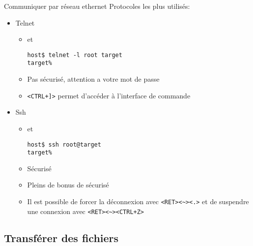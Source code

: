\begin{frame}[fragile=singleslide]{Communiquer par réseau ethernet}
  Protocoles les plus utilisés:
  \begin{itemize}
  \item Telnet
    \begin{itemize}
    \item {} et 
\begin{lstlisting}
host$ telnet -l root target
target%
\end{lstlisting} %
    \item   Pas   sécurisé,   attention   a   votre   mot   de   passe
    \item \verb/<CTRL+]>/ permet d'accéder à l'interface de commande
    \end{itemize}
  \item Ssh
    \begin{itemize}
    \item {} et 
\begin{lstlisting}
host$ ssh root@target
target%
\end{lstlisting} %
    \item Sécurisé
    \item Pleins de bonus de sécurisé
    \item   Il   est   possible   de  forcer   la   déconnexion   avec
      \verb/<RET><~><.>/   et   de   suspendre  une   connexion   avec
      \verb/<RET><~><CTRL+Z>/
    \end{itemize}
  \end{itemize}
\end{frame}

\subsection{Transférer des fichiers}

